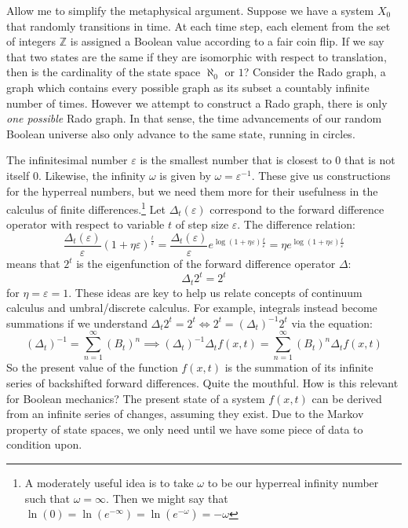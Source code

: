 \documentclass[10pt, a5paper, twoside, openright]{memoir}
\begin{document}
Allow me to simplify the metaphysical argument. Suppose we have a system $X_0$ that randomly transitions in time. At each time step, each element from the set of integers $\mathbb Z$ is assigned a Boolean value according to a fair coin flip. If we say that two states are the same if they are isomorphic with respect to translation, then is the cardinality of the state space $\aleph_0$ or $1$? Consider the Rado graph, a graph which contains every possible graph as its subset a countably infinite number of times. However we attempt to construct a Rado graph, there is only \textit{one possible} Rado graph. In that sense, the time advancements of our random Boolean universe also only advance to the same state, running in circles.

The infinitesimal number $\varepsilon$ is the smallest number that is closest to $0$ that is not itself $0$. Likewise, the infinity $\omega$ is given by $\omega = \varepsilon^{-1}$. These give us constructions for the hyperreal numbers, but we need them more for their usefulness in the calculus of finite differences.\footnote{A moderately useful idea is to take $\omega$ to be our hyperreal infinity number such that $\omega = \infty$. Then we might say that $\ln(0) = \ln(e^{-\infty}) = \ln(e^{-\omega}) = -\omega$} Let $\Delta_t(\varepsilon)$ correspond to the forward difference operator with respect to variable $t$ of step size $\varepsilon$. The difference relation:
$$\frac{\Delta_t(\varepsilon)}{\varepsilon} (1 + \eta \varepsilon)^{\frac{t}{\varepsilon}} =
\frac{\Delta_t(\varepsilon)}{\varepsilon} e^{\log(1 + \eta \varepsilon)\frac{t}{\varepsilon}} = 
\eta e^{\log(1 + \eta \varepsilon)\frac{t}{\varepsilon}}
$$
means that $2^t$ is the eigenfunction of the forward difference operator $\Delta$:
$$\Delta_t 2^t = 2^t$$
for $\eta = \varepsilon = 1$. These ideas are key to help us relate concepts of continuum calculus and umbral/discrete calculus. For example, integrals instead become summations if we understand $\Delta_t 2^t = 2^t \iff 2^t = (\Delta_t)^{-1} 2^t$ via the equation:
$$(\Delta_t)^{-1} = \sum\limits_{n=1}^{\infty} (B_t)^n \implies (\Delta_t)^{-1} \Delta_t f(x,t) = \sum\limits_{n=1}^{\infty} (B_t)^n \Delta_t f(x,t)$$
So the present value of the function $f(x, t)$ is the summation of its infinite series of backshifted forward differences. Quite the mouthful. How is this relevant for Boolean mechanics? The present state of a system $f(x,t)$ can be derived from an infinite series of changes, assuming they exist. Due to the Markov property of state spaces, we only need until we have some piece of data to condition upon.
\end{document}
